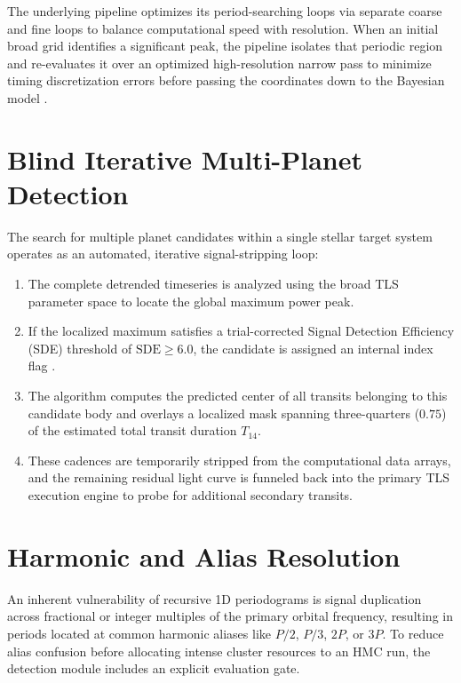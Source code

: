 \documentclass[12pt,a4paper,oneside]{report}
\newcommand{\Tfourteen}{\ensuremath{T_{14}}}
\begin{document}
The underlying pipeline optimizes its period-searching loops via separate coarse and fine loops to balance computational speed with resolution. When an initial broad grid identifies a significant peak, the pipeline isolates that periodic region and re-evaluates it over an optimized high-resolution narrow pass to minimize timing discretization errors before passing the coordinates down to the Bayesian model \cite{tess_exoplanet_pipeline.zip:pbs_query/run_bayesian_test.out}.

\section{Blind Iterative Multi-Planet Detection}
The search for multiple planet candidates within a single stellar target system operates as an automated, iterative signal-stripping loop:
\begin{enumerate}
  \item The complete detrended timeseries is analyzed using the broad TLS parameter space to locate the global maximum power peak.
  \item If the localized maximum satisfies a trial-corrected Signal Detection Efficiency (SDE) threshold of \(\mathrm{SDE} \ge 6.0\), the candidate is assigned an internal index flag \cite{tess_exoplanet_pipeline.zip:pbs_query/run_bayesian_test.out}.
  \item The algorithm computes the predicted center of all transits belonging to this candidate body and overlays a localized mask spanning three-quarters (\(0.75\)) of the estimated total transit duration \Tfourteen.
  \item These cadences are temporarily stripped from the computational data arrays, and the remaining residual light curve is funneled back into the primary TLS execution engine to probe for additional secondary transits.
\end{enumerate}

\section{Harmonic and Alias Resolution}
An inherent vulnerability of recursive 1D periodograms is signal duplication across fractional or integer multiples of the primary orbital frequency, resulting in periods located at common harmonic aliases like \(P/2\), \(P/3\), \(2P\), or \(3P\). To reduce alias confusion before allocating intense cluster resources to an HMC run, the detection module includes an explicit evaluation gate. 
\end{document}
